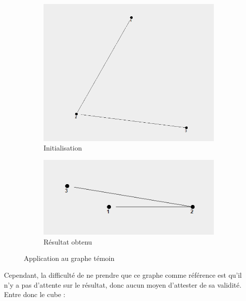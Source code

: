 \documentclass[a4paper,12pt]{article}
\begin{document}
\begin{figure}[H]
\centering
\begin{subfigure}{.5\textwidth}
  \centering
  \includegraphics[width=.5\linewidth]{temoin.png}
  \caption{Initialisation}
  \label{fig:Sub1}
\end{subfigure}%
\begin{subfigure}{.5\textwidth}
  \centering
  \includegraphics[width=.5\linewidth]{temoin_err.png}
  \caption{Résultat obtenu}
  \label{fig:sub2}
\end{subfigure}
\caption{Application au graphe témoin}
\label{fig:test2}
\end{figure}

Cependant, la difficulté de ne prendre que ce graphe comme référence est qu’il n’y a pas d’attente sur le résultat, donc aucun moyen d’attester de sa validité. Entre donc le cube :
\end{document}
